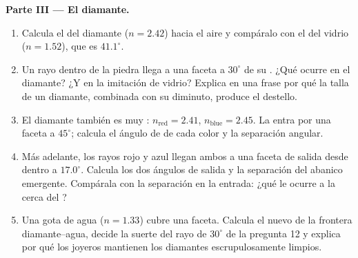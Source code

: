 \begin{problem}
\medskip
\noindent\textbf{Parte III --- El diamante.}
\begin{enumerate}[resume]
  \item Calcula el  del diamante ($n = 2.42$) hacia el aire
        y compáralo con el del vidrio ($n = 1.52$), que es $41.1^\circ$.
  \item Un rayo dentro de la piedra llega a una faceta a $30^\circ$ de
        su . ¿Qué ocurre en el diamante? ¿Y en la imitación de
        vidrio? Explica en una frase por qué la talla de un diamante,
        combinada con su  diminuto, produce el destello.
  \item El diamante también es muy : $n_{\text{red}} = 2.41$,
        $n_{\text{blue}} = 2.45$. La  entra por una faceta a
        $45^\circ$; calcula el ángulo de  de cada color y la
        separación angular.
  \item Más adelante, los rayos rojo y azul llegan ambos a una faceta de
        salida desde dentro a $17.0^\circ$. Calcula los dos ángulos de
        salida y la separación del abanico emergente. Compárala con la
        separación en la entrada: ¿qué le ocurre a la  cerca
        del ?
  \item Una gota de agua ($n = 1.33$) cubre una faceta. Calcula el nuevo
         de la frontera diamante--agua, decide la suerte
        del rayo de $30^\circ$ de la pregunta 12 y explica por qué los
        joyeros mantienen los diamantes escrupulosamente limpios.
\end{enumerate}


\end{problem}
